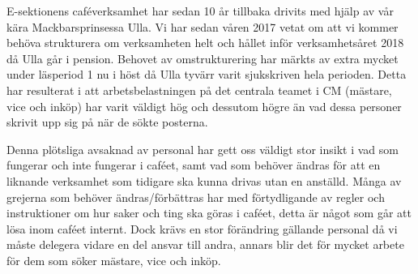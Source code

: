 \documentclass[../_main/handlingar.tex]{subfiles}
\begin{document}
E-sektionens caféverksamhet har sedan 10 år tillbaka drivits med hjälp av vår kära Mackbarsprinsessa Ulla. Vi har sedan våren 2017 vetat om att vi kommer behöva strukturera om verksamheten helt och hållet inför verksamhetsåret 2018 då Ulla går i pension. Behovet av omstrukturering har märkts av extra mycket under läsperiod 1 nu i höst då Ulla tyvärr varit sjukskriven hela perioden. Detta har resulterat i att arbetsbelastningen på det centrala teamet i CM (mästare, vice och inköp) har varit väldigt hög och dessutom högre än vad dessa personer skrivit upp sig på när de sökte posterna.

Denna plötsliga avsaknad av personal har gett oss väldigt stor insikt i vad som fungerar och inte fungerar i caféet, samt vad som behöver ändras för att en liknande verksamhet som tidigare ska kunna drivas utan en anställd. Många av grejerna som behöver ändras/förbättras har med förtydligande av regler och instruktioner om hur saker och ting ska göras i caféet, detta är något som går att lösa inom caféet internt. Dock krävs en stor förändring gällande personal då vi måste delegera vidare en del ansvar till andra, annars blir det för mycket arbete för dem som söker mästare, vice och inköp.
\end{document}
